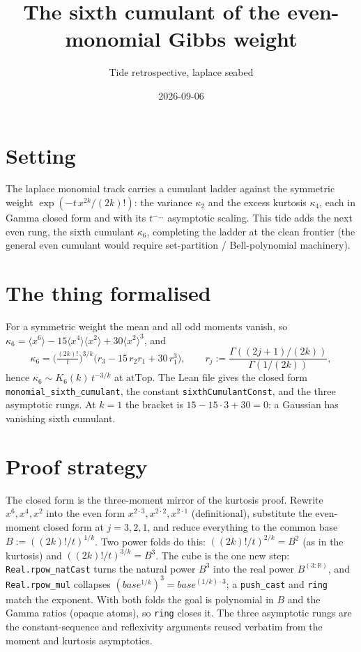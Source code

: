\documentclass[11pt]{article}
\title{The sixth cumulant of the even-monomial Gibbs weight}
\author{Tide retrospective, laplace seabed}
\date{2026-09-06}
\begin{document}
\sloppy
\maketitle
\section{Setting}
The laplace monomial track carries a cumulant ladder against the symmetric weight
$\exp(-t\,x^{2k}/(2k)!)$: the variance $\kappa_2$ and the excess kurtosis $\kappa_4$, each in Gamma
closed form and with its $t^{-\ldots}$ asymptotic scaling. This tide adds the next even rung, the
sixth cumulant $\kappa_6$, completing the ladder at the clean frontier (the general even cumulant
would require set-partition / Bell-polynomial machinery).
\section{The thing formalised}
For a symmetric weight the mean and all odd moments vanish, so
$\kappa_6 = \langle x^6\rangle - 15\langle x^4\rangle\langle x^2\rangle + 30\langle x^2\rangle^3$, and
\[
  \kappa_6 = \Big(\tfrac{(2k)!}{t}\Big)^{3/k}\big(r_3 - 15\,r_2 r_1 + 30\,r_1^3\big),\qquad
  r_j := \frac{\Gamma((2j+1)/(2k))}{\Gamma(1/(2k))},
\]
hence $\kappa_6 \sim K_6(k)\,t^{-3/k}$ at $\mathrm{atTop}$. The Lean file gives the closed form
\texttt{monomial\_sixth\_cumulant}, the constant \texttt{sixthCumulantConst}, and the three asymptotic
rungs. At $k=1$ the bracket is $15 - 15\cdot 3 + 30 = 0$: a Gaussian has vanishing sixth cumulant.
\section{Proof strategy}
The closed form is the three-moment mirror of the kurtosis proof. Rewrite $x^6, x^4, x^2$ into the
even form $x^{2\cdot 3}, x^{2\cdot 2}, x^{2\cdot 1}$ (definitional), substitute the even-moment closed
form at $j=3,2,1$, and reduce everything to the common base $B := ((2k)!/t)^{1/k}$. Two power folds do
this: $((2k)!/t)^{2/k} = B^2$ (as in the kurtosis) and $((2k)!/t)^{3/k} = B^3$. The cube is the one
new step: \texttt{Real.rpow\_natCast} turns the natural power $B^3$ into the real power $B^{(3:\mathbb{R})}$,
and \texttt{Real.rpow\_mul} collapses $(base^{1/k})^{3} = base^{(1/k)\cdot 3}$; a \texttt{push\_cast}
and \texttt{ring} match the exponent. With both folds the goal is polynomial in $B$ and the Gamma
ratios (opaque atoms), so \texttt{ring} closes it. The three asymptotic rungs are the constant-sequence
and reflexivity arguments reused verbatim from the moment and kurtosis asymptotics.
\end{document}
